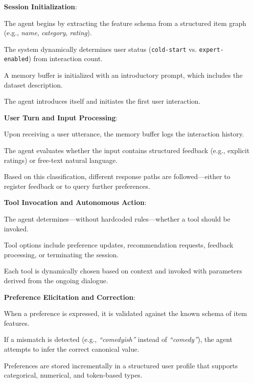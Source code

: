 \begin{compactenum}
    \item \textbf{Session Initialization}:
    \begin{compactitem}
        \item The agent begins by extracting the feature schema from a structured item graph (e.g., \textit{name}, \textit{category}, \textit{rating}).
        \item The system dynamically determines user status (\texttt{cold-start} vs. \texttt{expert-enabled}) from interaction count.
        \item A memory buffer is initialized with an introductory prompt, which includes the dataset description. 
        \item The agent introduces itself and initiates the first user interaction.
    \end{compactitem}

    \item \textbf{User Turn and Input Processing}:
    \begin{compactitem}
        \item Upon receiving a user utterance, the memory buffer logs the interaction history.
        \item The agent evaluates whether the input contains structured feedback (e.g., explicit ratings) or free-text natural language.
        \item Based on this classification, different response paths are followed---either to register feedback or to query further preferences.
    \end{compactitem}

    \item \textbf{Tool Invocation and Autonomous Action}:
    \begin{compactitem}
        \item The agent determines---without hardcoded rules---whether a tool should be invoked.
        \item Tool options include preference updates, recommendation requests, feedback processing, or terminating the session.
        \item Each tool is dynamically chosen based on context and invoked with parameters derived from the ongoing dialogue.
    \end{compactitem}

    \item \textbf{Preference Elicitation and Correction}:
    \begin{compactitem}
        \item When a preference is expressed, it is validated against the known schema of item features.
        \item If a mismatch is detected (e.g., \textit{``comedyish''} instead of \textit{``comedy''}), the agent attempts to infer the correct canonical value.
        \item Preferences are stored incrementally in a structured user profile that supports categorical, numerical, and token-based types.
    \end{compactitem}


\end{compactenum}

